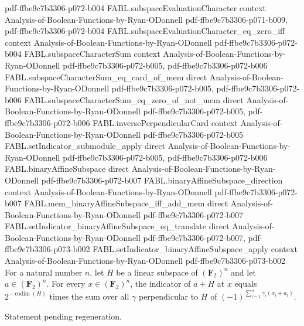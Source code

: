 \begin{theorem}
  {pdf-ffbe9c7b3306-p072-b004}
\proofstep
  {FABL.subspaceEvaluationCharacter}
  {context}
  {Analysis-of-Boolean-Functions-by-Ryan-ODonnell}
  {pdf-ffbe9c7b3306-p071-b009,
    pdf-ffbe9c7b3306-p072-b004}
\proofstep
  {FABL.subspaceEvaluationCharacter_eq_zero_iff}
  {context}
  {Analysis-of-Boolean-Functions-by-Ryan-ODonnell}
  {pdf-ffbe9c7b3306-p072-b004}
\proofstep
  {FABL.subspaceCharacterSum}
  {context}
  {Analysis-of-Boolean-Functions-by-Ryan-ODonnell}
  {pdf-ffbe9c7b3306-p072-b005,
    pdf-ffbe9c7b3306-p072-b006}
\proofstep
  {FABL.subspaceCharacterSum_eq_card_of_mem}
  {direct}
  {Analysis-of-Boolean-Functions-by-Ryan-ODonnell}
  {pdf-ffbe9c7b3306-p072-b005,
    pdf-ffbe9c7b3306-p072-b006}
\proofstep
  {FABL.subspaceCharacterSum_eq_zero_of_not_mem}
  {direct}
  {Analysis-of-Boolean-Functions-by-Ryan-ODonnell}
  {pdf-ffbe9c7b3306-p072-b005,
    pdf-ffbe9c7b3306-p072-b006}
\proofstep
  {FABL.inversePerpendicularCard}
  {context}
  {Analysis-of-Boolean-Functions-by-Ryan-ODonnell}
  {pdf-ffbe9c7b3306-p072-b005}
\proofstep
  {FABL.setIndicator_submodule_apply}
  {direct}
  {Analysis-of-Boolean-Functions-by-Ryan-ODonnell}
  {pdf-ffbe9c7b3306-p072-b005,
    pdf-ffbe9c7b3306-p072-b006}
\proofstep
  {FABL.binaryAffineSubspace}
  {direct}
  {Analysis-of-Boolean-Functions-by-Ryan-ODonnell}
  {pdf-ffbe9c7b3306-p072-b007}
\proofstep
  {FABL.binaryAffineSubspace_direction}
  {context}
  {Analysis-of-Boolean-Functions-by-Ryan-ODonnell}
  {pdf-ffbe9c7b3306-p072-b007}
\proofstep
  {FABL.mem_binaryAffineSubspace_iff_add_mem}
  {direct}
  {Analysis-of-Boolean-Functions-by-Ryan-ODonnell}
  {pdf-ffbe9c7b3306-p072-b007}
\proofstep
  {FABL.setIndicator_binaryAffineSubspace_eq_translate}
  {direct}
  {Analysis-of-Boolean-Functions-by-Ryan-ODonnell}
  {pdf-ffbe9c7b3306-p072-b007,
    pdf-ffbe9c7b3306-p073-b002}
\proofstep
  {FABL.setIndicator_binaryAffineSubspace_apply}
  {context}
  {Analysis-of-Boolean-Functions-by-Ryan-ODonnell}
  {pdf-ffbe9c7b3306-p073-b002}
For a natural number $n$, let $H$ be a linear subspace of $(\mathbf F_2)^n$ and let
$a\in(\mathbf F_2)^n$. For every $x\in(\mathbf F_2)^n$, the indicator of $a+H$ at $x$
equals $2^{-\operatorname{codim}(H)}$ times the sum over all $\gamma$ perpendicular to
$H$ of $(-1)^{\sum_{i=1}^n\gamma_i(x_i+a_i)}$.
\end{theorem}

\begin{theorem}
\label{FABL.vectorFourierCoeff_setIndicator_binaryAffineSubspace_of_mem}
\leanok
{}
Statement pending regeneration.
\end{theorem}

